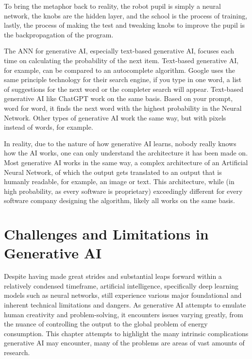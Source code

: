 \documentclass[a4paper,12pt]{report}
\begin{document}
To bring the metaphor back to reality, the robot pupil is simply a neural network, the knobs are the hidden layer, and the school is the process of training, lastly, the process of making the test and tweaking knobs to improve the pupil is the backpropagation of the program.

The ANN for generative AI, especially text-based generative AI, focuses each time on calculating the probability of the next item. Text-based generative AI, for example, can be compared to an autocomplete algorithm. Google uses the same principle technology for their search engine, if you type in one word, a list of suggestions for the next word or the completer search will appear. Text-based generative AI like ChatGPT work on the same basis. Based on your prompt, word for word, it finds the next word with the highest probability in the Neural Network. Other types of generative AI work the same way, but with pixels instead of words, for example.

In reality, due to the nature of how generative AI learns, nobody really knows how the AI works, one can only understand the architecture it has been made on. Most generative AI works in the same way, a complex architecture of an Artificial Neural Network, of which the output gets translated to an output that is humanly readable, for example, an image or text. This architecture, while (in high probability, as every software is proprietary) exceedingly different for every software company designing the algorithm, likely all works on the same basis.

\newpage
\section{Challenges and Limitations in Generative AI} \label{sect:challengels}
\hspace{10mm} Despite having made great strides and substantial leaps forward within a relatively condensed timeframe, artificial intelligence, specifically deep learning models such as neural networks, still experience various major foundational and inherent technical limitations and dangers. As generative AI attempts to emulate human creativity and problem-solving, it encounters issues varying greatly, from the nuance of controlling the output to the global problem of energy consumption. This chapter attempts to highlight the many intrinsic complications generative AI may encounter, many of the problems are areas of vast amounts of research.\\
\end{document}
